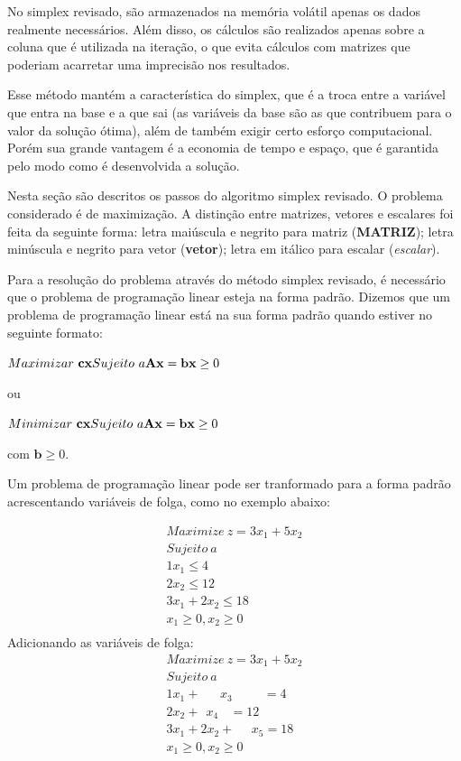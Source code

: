 No simplex revisado, são armazenados na memória volátil apenas os dados realmente necessários. Além disso, os cálculos são realizados apenas sobre a coluna que é utilizada na iteração, o que evita cálculos com matrizes que poderiam acarretar uma imprecisão nos resultados.

Esse método mantém a característica do simplex, que é a troca entre a variável que entra na base e a que sai (as variáveis da base são as que contribuem para o valor da solução ótima), além de também exigir certo esforço computacional. Porém sua grande vantagem é a economia de tempo e espaço, que é garantida pelo modo como é desenvolvida a solução. 

Nesta seção são descritos os passos do algoritmo simplex revisado. O problema considerado é de maximização. A distinção entre matrizes, vetores e escalares foi feita da seguinte forma: letra maiúscula e negrito para matriz (\textbf{MATRIZ}); letra minúscula e negrito para vetor (\textbf{vetor}); letra em itálico para escalar (\textit{escalar}).

Para a resolução do problema através do método simplex revisado, é necessário que o problema de programação linear esteja na forma padrão. Dizemos que um problema de programação linear está na sua forma padrão quando estiver no seguinte formato:

$\\
Maximizar\ \mathbf{cx} \\
Sujeito\ a \\
\mathbf{Ax} = \mathbf{b} \\
\mathbf{x} \geq0$

ou

$\\
Minimizar\ \mathbf{cx} \\
Sujeito\ a \\
\mathbf{Ax} = \mathbf{b} \\
\mathbf{x} \geq0$

com $\mathbf{b}\geq0$.

Um problema de programação linear pode ser tranformado para a forma padrão acrescentando variáveis de folga, como no exemplo abaixo:

\begin{align*}
Maximize\ z=3x_{1}+5x_{2}\\ 
Sujeito\ a \\ 
1x_{1}\leq 4 \\  
2x_{2}\leq 12 \\ 
3x_{1}+2x_{2}\leq 18 \\ 
 x_{1}\geq 0, x_{2}\geq 0 \\
\end{align*}
Adicionando as variáveis de folga:
\begin{align*}
Maximize\ z=3x_{1}+5x_{2}\\ 
Sujeito\ a\\
1x_{1}+\ \ \ \ \ \ \ x_{3}\ \ \ \ \ \ \ \ \ \ \ = 4 \\  
2x_{2}+\ \ x_{4}\ \ \ \ = 12 \\ 
3x_{1}+2x_{2}+\ \ \ \ \ \ x_{5}= 18 \\ 
 x_{1}\geq 0, x_{2}\geq 0 \\
\end{align*}

